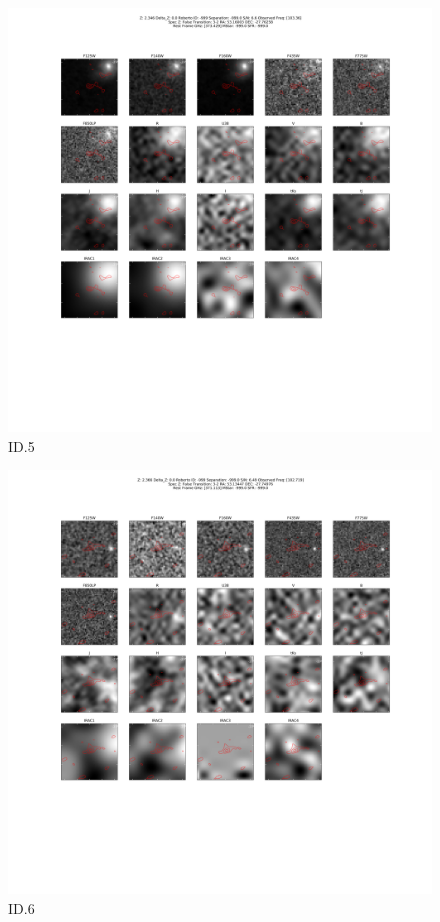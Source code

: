 \begin{figure}[tbp]
\centering \includegraphics[width=120mm]{Matched/ASPECS_Cutout_5.png}
\caption{ID.5}
\label{fig:Match_Three}
\end{figure}

\begin{figure}[tbp]
\centering \includegraphics[width=120mm]{Matched/ASPECS_Cutout_6.png}
\caption{ID.6}
\label{fig:Match_Three}
\end{figure}

